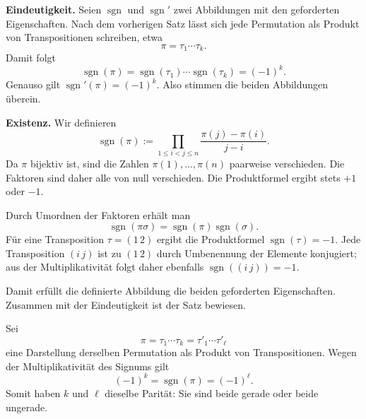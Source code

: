 \begin{myproof}
\textbf{Eindeutigkeit.} Seien \(\operatorname{sgn}\) und \(\operatorname{sgn}'\) zwei Abbildungen mit den geforderten Eigenschaften. Nach dem vorherigen Satz lässt sich jede Permutation als Produkt von Transpositionen schreiben, etwa
\[
\pi=\tau_1\cdots\tau_k.
\]
Damit folgt
\[
\operatorname{sgn}(\pi)
=\operatorname{sgn}(\tau_1)\cdots\operatorname{sgn}(\tau_k)
=(-1)^k.
\]
Genauso gilt \(\operatorname{sgn}'(\pi)=(-1)^k\). Also stimmen die beiden Abbildungen überein.

\textbf{Existenz.} Wir definieren
\[
\operatorname{sgn}(\pi)
:=
\prod_{1\leq i<j\leq n}
\frac{\pi(j)-\pi(i)}{j-i}.
\]
Da \(\pi\) bijektiv ist, sind die Zahlen \(\pi(1),\ldots,\pi(n)\) paarweise verschieden. Die Faktoren sind daher alle von null verschieden. Die Produktformel ergibt stets \(+1\) oder \(-1\).

Durch Umordnen der Faktoren erhält man
\[
\operatorname{sgn}(\pi\sigma)
=\operatorname{sgn}(\pi)\operatorname{sgn}(\sigma).
\]
Für eine Transposition \(\tau=(1\,2)\) ergibt die Produktformel \(\operatorname{sgn}(\tau)=-1\). Jede Transposition \((i\,j)\) ist zu \((1\,2)\) durch Umbenennung der Elemente konjugiert; aus der Multiplikativität folgt daher ebenfalls \(\operatorname{sgn}((i\,j))=-1\).

Damit erfüllt die definierte Abbildung die beiden geforderten Eigenschaften. Zusammen mit der Eindeutigkeit ist der Satz bewiesen.
\end{myproof}


\begin{myproof}
Sei
\[
\pi=\tau_1\cdots\tau_k=\tau'_1\cdots\tau'_\ell
\]
eine Darstellung derselben Permutation als Produkt von Transpositionen. Wegen der Multiplikativität des Signums gilt
\[
(-1)^k=\operatorname{sgn}(\pi)=(-1)^\ell.
\]
Somit haben \(k\) und \(\ell\) dieselbe Parität: Sie sind beide gerade oder beide ungerade.
\end{myproof}


